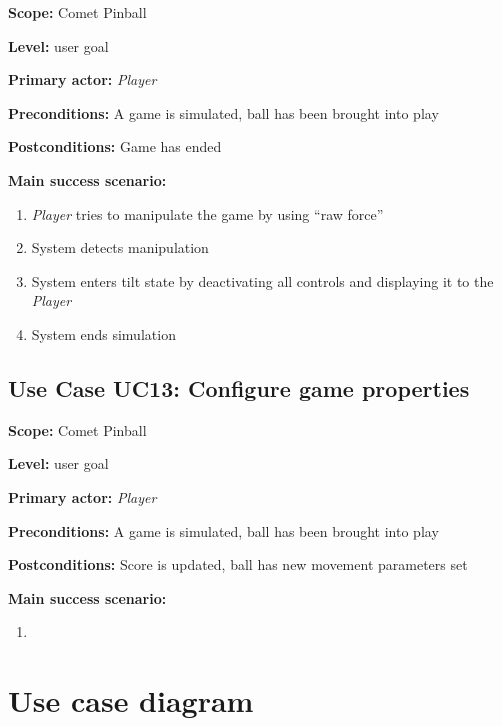 \documentclass[fontsize=12pt,
               paper=a4,
               twoside=false,
               parskip=half,
               ]{scrartcl}
\begin{document}
\textbf{\textsf{Scope:}} Comet Pinball

\textbf{\textsf{Level:}} user goal

\textbf{\textsf{Primary actor:}} \emph{Player}

\textbf{\textsf{Preconditions:}} A game is simulated, ball has been brought into play

\textbf{\textsf{Postconditions:}} Game has ended

\textbf{\textsf{Main success scenario:}}

\begin{enumerate}[leftmargin=3em]
	\item \emph{Player} tries to manipulate the game by using \enquote{raw force}
	\item System detects manipulation
	\item System enters tilt state by deactivating all controls and displaying it to the \emph{Player}
	\item System ends simulation
\end{enumerate}




\subsection{Use Case UC13: Configure game properties }

\textbf{\textsf{Scope:}} Comet Pinball

\textbf{\textsf{Level:}} user goal

\textbf{\textsf{Primary actor:}} \emph{Player}

\textbf{\textsf{Preconditions:}} A game is simulated, ball has been brought into play

\textbf{\textsf{Postconditions:}} Score is updated, ball has new movement parameters set

\textbf{\textsf{Main success scenario:}}

\begin{enumerate}[leftmargin=3em]
	\item 
\end{enumerate}


\section{Use case diagram}
\end{document}
